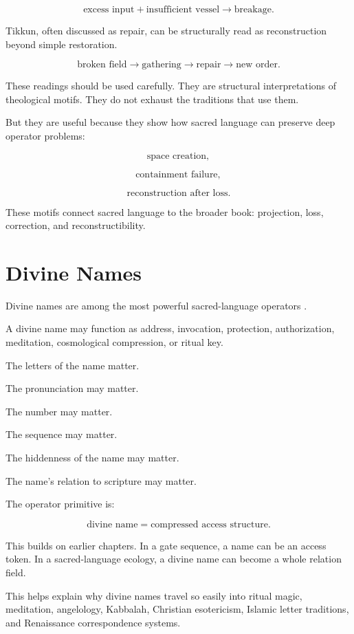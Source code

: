 \documentclass[11pt]{book}
\begin{document}
\[
\text{excess input}
+
\text{insufficient vessel}
\rightarrow
\text{breakage}.
\]

Tikkun, often discussed as repair, can be structurally read as reconstruction beyond simple restoration.

\[
\text{broken field}
\rightarrow
\text{gathering}
\rightarrow
\text{repair}
\rightarrow
\text{new order}.
\]

These readings should be used carefully. They are structural interpretations of theological motifs. They do not exhaust the traditions that use them.

But they are useful because they show how sacred language can preserve deep operator problems:

\[
\text{space creation},
\]

\[
\text{containment failure},
\]

\[
\text{reconstruction after loss}.
\]

These motifs connect sacred language to the broader book: projection, loss, correction, and reconstructibility.

\section{Divine Names}

Divine names are among the most powerful sacred-language operators \cite{Scholem1974Kabbalah,Idel1988KabbalahNewPerspectives,Pinch1994MagicEgypt}.

A divine name may function as address, invocation, protection, authorization, meditation, cosmological compression, or ritual key.

The letters of the name matter.

The pronunciation may matter.

The number may matter.

The sequence may matter.

The hiddenness of the name may matter.

The name's relation to scripture may matter.

The operator primitive is:

\[
\text{divine name} = \text{compressed access structure}.
\]

This builds on earlier chapters. In a gate sequence, a name can be an access token. In a sacred-language ecology, a divine name can become a whole relation field.

This helps explain why divine names travel so easily into ritual magic, meditation, angelology, Kabbalah, Christian esotericism, Islamic letter traditions, and Renaissance correspondence systems.
\end{document}
